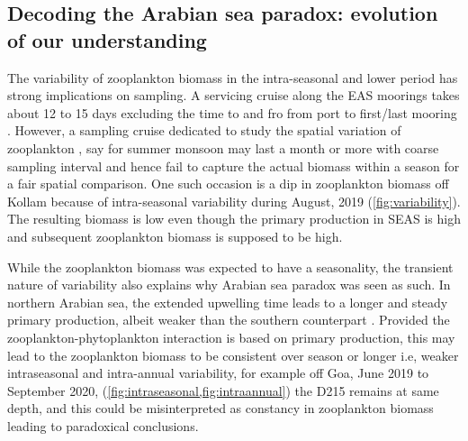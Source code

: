 \documentclass{article}
\begin{document}
	\subsection{Decoding the Arabian sea paradox: evolution of our understanding}
	The variability of zooplankton biomass in the intra-seasonal and lower period has strong implications on sampling. A servicing cruise along the EAS moorings takes about 12 to 15 days excluding the time to and fro from port to first/last mooring \citep{chaudhuri2020observed, aparna2022seasonal}. However, a sampling cruise dedicated to study the spatial variation of zooplankton \citep{madhupratap1992zooplankton,smith1998seasonal,wishner1998mesozooplankton, kidwai2000dd}, say for summer monsoon may last a month or more with coarse sampling interval and hence fail to capture the actual biomass within a season for a fair spatial comparison. One such occasion is a dip in zooplankton biomass off Kollam because of intra-seasonal variability during August, 2019 (\cref{fig:variability}). The resulting biomass is low even though the primary production in SEAS \citep{ashadevi20101070, jyothibabu2010re} is high and subsequent zooplankton biomass is supposed to be high.
	
	While the zooplankton biomass was expected to have a seasonality, the transient nature of variability also explains why Arabian sea paradox was seen as such. In northern Arabian sea, the extended upwelling time leads to a longer and steady primary production, albeit weaker than the southern counterpart \citep{madhupratap1996lack, smith2005mesozooplankton}. Provided the zooplankton-phytoplankton interaction is based on primary production, this may lead to the zooplankton biomass to be consistent over season or longer i.e, weaker intraseasonal and intra-annual variability, for example off Goa, June 2019 to September 2020, (\cref{fig:intraseasonal,fig:intraannual}) the D215 remains at same depth, and this could be misinterpreted as constancy in zooplankton biomass leading to paradoxical conclusions. 	 
	
\end{document}
